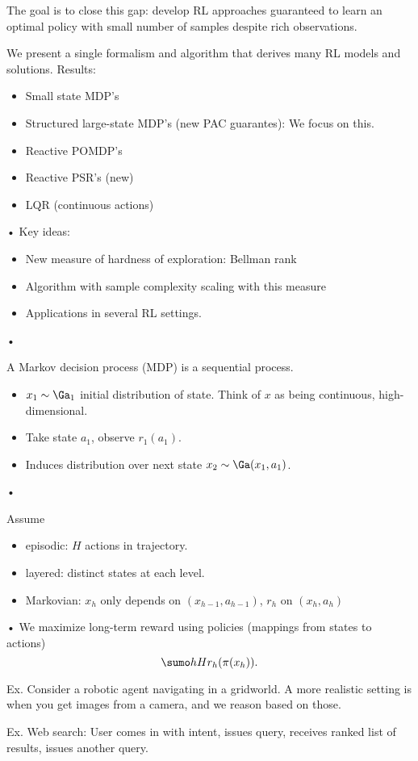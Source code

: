 The goal is to close this gap: develop RL approaches guaranteed to learn an optimal policy with small number of samples despite rich observations.

We present a single formalism and algorithm that derives many RL models and solutions. 
Results:
\begin{itemize}
\item
Small state MDP's
\item
Structured large-state MDP's (new PAC guarantes): We focus on this.
\item
Reactive POMDP's
\item
Reactive PSR's (new)
\item
LQR (continuous actions)
\end{itemize}•
Key ideas:
\begin{itemize}
\item
New measure of hardness of exploration: Bellman rank
\item
Algorithm with sample complexity scaling with this measure
\item
Applications in several RL settings.
\end{itemize}•

A Markov decision process (MDP) is a sequential process.
\begin{itemize}
\item
$x_1\sim \Ga_1$ initial distribution of state. Think of $x$ as being continuous, high-dimensional.
\item
Take state $a_1$, observe $r_1(a_1)$.
\item
Induces distribution over next state $x_2\sim \Ga(x_1,a_1)$.
\end{itemize}•

Assume
\begin{itemize}
\item
episodic: $H$ actions in trajectory.
\item
layered: distinct states at each level.
\item
Markovian: $x_h$ only depends on $(x_{h-1},a_{h-1})$, $r_h$ on $(x_h,a_h)$
\end{itemize}•
We maximize long-term reward using policies (mappings from states to actions)
$$
\sumo hH r_h(\pi(x_h)).
$$

Ex. Consider a robotic agent navigating in a gridworld.
A more realistic setting is when you get images from a camera, and we reason based on those.

Ex. Web search: User comes in with intent, issues query, receives ranked list of results, issues another query. 

